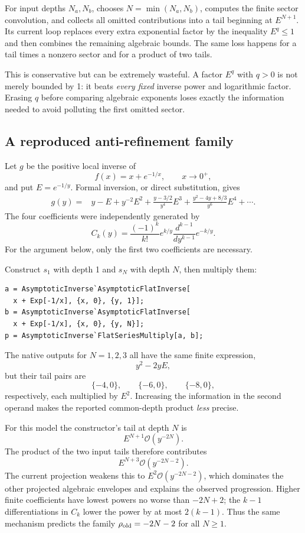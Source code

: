 \documentclass[11pt,letterpaper]{article}
\newcommand{\code}[1]{\texttt{\detokenize{#1}}}
\newcommand{\OO}{\mathcal O}
\begin{document}
For input depths $N_a,N_b$, \code{flatOpsMultiplyData} chooses
$N=\min(N_a,N_b)$, computes the finite sector convolution, and collects all
omitted contributions into a tail beginning at $E^{N+1}$. Its current loop
replaces every extra exponential factor by the inequality $E^q\le1$ and then
combines the remaining algebraic bounds. The same loss happens for a tail
times a nonzero sector and for a product of two tails.\cite{flatops}

This is conservative but can be extremely wasteful. A factor $E^q$ with
$q>0$ is not merely bounded by 1: it beats \emph{every fixed} inverse power
and logarithmic factor. Erasing $q$ before comparing algebraic exponents loses
exactly the information needed to avoid polluting the first omitted sector.

\subsection{A reproduced anti-refinement family}
Let $g$ be the positive local inverse of
\[
 f(x)=x+e^{-1/x},\qquad x\to0^+,
\]
and put $E=e^{-1/y}$. Formal inversion, or direct substitution, gives
\begin{align}
 g(y)={}&y-E+y^{-2}E^2
 +\frac{y-3/2}{y^4}E^3
 +\frac{y^2-4y+8/3}{y^6}E^4+\cdots.
 \label{eq:flat-inverse}
\end{align}
The four coefficients were independently generated by
\[
 C_k(y)=\frac{(-1)^k}{k!}e^{k/y}
             \frac{d^{k-1}}{dy^{k-1}}e^{-k/y}.
\]
For the argument below, only the first two coefficients are necessary.

Construct $s_1$ with depth 1 and $s_N$ with depth $N$, then multiply them:
\begin{lstlisting}
a = AsymptoticInverse`AsymptoticFlatInverse[
  x + Exp[-1/x], {x, 0}, {y, 1}];
b = AsymptoticInverse`AsymptoticFlatInverse[
  x + Exp[-1/x], {x, 0}, {y, N}];
p = AsymptoticInverse`FlatSeriesMultiply[a, b];
\end{lstlisting}
The native outputs for $N=1,2,3$ all have the same finite expression,
\[
 y^2-2yE,
\]
but their tail pairs are
\[
 \{-4,0\},\qquad\{-6,0\},\qquad\{-8,0\},
\]
respectively, each multiplied by $E^2$. Increasing the information in the
second operand makes the reported common-depth product \emph{less} precise.

For this model the constructor's tail at depth $N$ is
\[
 E^{N+1}\OO(y^{-2N}).
\]
The product of the two input tails therefore contributes
\[
 E^{N+3}\OO(y^{-2N-2}).
\]
The current projection weakens this to $E^2\OO(y^{-2N-2})$, which dominates the
other projected algebraic envelopes and explains the observed progression.
Higher finite coefficients have lowest powers no worse than $-2N+2$; the
$k-1$ differentiations in $C_k$ lower the power by at most $2(k-1)$. Thus the
same mechanism predicts the family $\rho_{\rm old}=-2N-2$ for all $N\ge1$.
\end{document}
